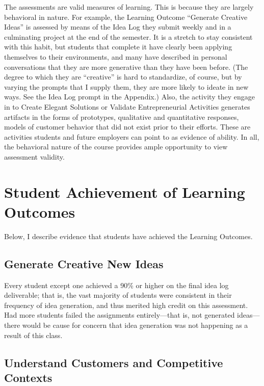 \documentclass[11pt,article,oneside]{memoir}
\begin{document}
The assessments are valid measures of learning. This is because they are
largely behavioral in nature. For example, the Learning Outcome
\enquote{Generate Creative Ideas} is assessed by means of the Idea Log
they submit weekly and in a culminating project at the end of the
semester. It is a stretch to stay consistent with this habit, but
students that complete it have clearly been applying themselves to their
environments, and many have described in personal conversations that
they are more generative than they have been before. (The degree to
which they are \enquote{creative} is hard to standardize, of course, but
by varying the prompts that I supply them, they are more likely to
ideate in new ways. See the Idea Log prompt in the Appendix.) Also, the
activity they engage in to Create Elegant Solutions or Validate
Entrepreneurial Activities generates artifacts in the forms of
prototypes, qualitative and quantitative responses, models of customer
behavior that did not exist prior to their efforts. These are activities
students and future employers can point to as evidence of ability. In
all, the behavioral nature of the course provides ample opportunity to
view assessment validity.

\section{Student Achievement of Learning
Outcomes}\label{student-achievement-of-learning-outcomes}

Below, I describe evidence that students have achieved the Learning
Outcomes.

\subsection{Generate Creative New
Ideas}\label{generate-creative-new-ideas-1}

Every student except one achieved a 90\% or higher on the final idea log
deliverable; that is, the vast majority of students were consistent in
their frequency of idea generation, and thus merited high credit on this
assessment. Had more students failed the assignments entirely---that is,
not generated ideas---there would be cause for concern that idea
generation was not happening as a result of this class.

\subsection{Understand Customers and Competitive
Contexts}\label{understand-customers-and-competitive-contexts-1}
\end{document}
